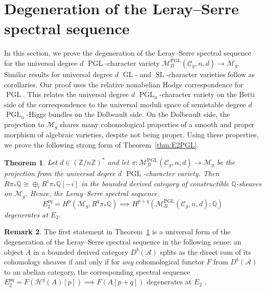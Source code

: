 \documentclass[11pt,reqno]{amsart}
\theoremstyle{plain} %
\newtheorem{theorem}{Theorem}[section]
\theoremstyle{definition}
\newtheorem{remark}[theorem]{Remark}
\newcommand{\QQ}{\mathbb{Q}}
\newcommand{\M}{\mathcal{M}}
\newcommand{\C}{\mathcal{C}}
\newcommand{\mc}{\mathcal}
\newcommand{\ZZ}{\mathbb{Z}}
\DeclareMathOperator{\GL}{GL}
\DeclareMathOperator{\SL}{SL}
\DeclareMathOperator{\PGL}{PGL}
\begin{document}
\section{Degeneration of the Leray--Serre spectral sequence}\label{sec:degeneration}


In this section, we prove the degeneration of the Leray--Serre spectral sequence for the universal degree $d$ $\PGL$-character variety $\M_B^{\PGL}(\C_g, n,d) \to \M_g$. Similar results for universal degree $d$ $\GL$- and $\SL$-character varieties follow as corollaries. Our proof uses the relative nonabelian Hodge correspondence for $\PGL$. This relates the universal degree $d$ $\PGL_n$-character variety on the Betti side of the correspondence to the universal moduli space of semistable degree $d$ $\PGL_n$-Higgs bundles on the Dolbeault side. On the Dolbeault side, the projection to $\M_g$ shares many cohomological properties of a smooth and proper morphism of algebraic varieties, despite not being proper. 
Using these properties, we prove the following strong form of Theorem~\ref{thm:E2PGL}.%

\begin{theorem} \label{thm: splitting}
Let $d \in (\ZZ/n\ZZ)^*$ and let $\pi \colon \M_B^{\PGL}(\C_g, n,d) \to \M_g$ be the projection from the universal degree $d$ $\PGL$-character variety. Then $R\pi_* \QQ \cong \oplus_i R^i\pi_* \QQ[-i]$ in the bounded derived category of constructible $\QQ$-sheaves on $\M_g$. Hence, the Leray--Serre spectral sequence
    $$E_2^{pq} = H^p(\M_g, R^q\pi_* \QQ) \implies H^{p+q}(\M_B^{\PGL}(\C_g, n,d); \QQ)$$
    degenerates at $E_2$.
\end{theorem}

\begin{remark}
The first statement in Theorem~\ref{thm: splitting} is a universal form of the degeneration of the Leray--Serre spectral sequence in the following sense: an object $A$ in a bounded derived category $D^b(\mc A)$ splits as the direct sum of its cohomology sheaves if and only if for \textit{any} cohomological functor $F$ from $D^b(\mc A)$ to an abelian category, the corresponding spectral sequence $E_2^{pq} = F(\mc H^q(A)[p]) \implies F(A[p+q])$ degenerates at $E_2$ \cite[Proposition~1.2]{DeligneE2}.
\end{remark}

\end{document}
